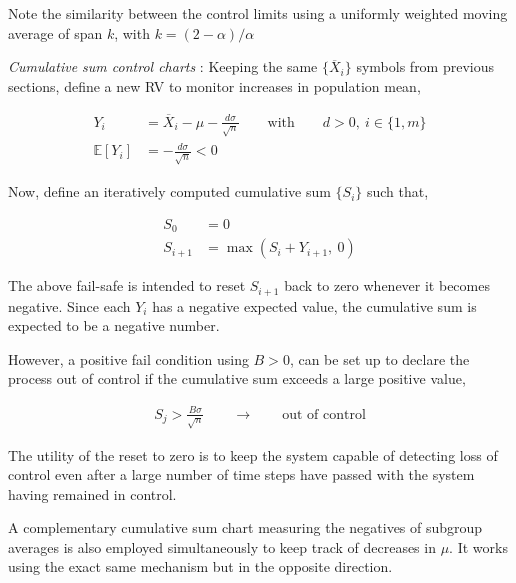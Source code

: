 Note the similarity between the control limits using a uniformly weighted moving average of span $ k $, with $ k = (2-\alpha)/\alpha $

\textit{Cumulative sum control charts} : Keeping the same $ \{\overline{X}_i\} $ symbols from previous sections, define a new RV to monitor increases in population mean, 

\begin{align}
	Y_i &= \overline{X}_i - \mu - \frac{d\sigma}{\sqrt{n}} \qquad \text{with} \qquad d > 0,\ i \in \{1, m\} \\
	\mathbb{E}[Y_i] &= - \frac{d\sigma}{\sqrt{n}} < 0
\end{align}

Now, define an iteratively computed cumulative sum $ \{S_i\} $ such that,

\begin{align}
	S_0 &= 0 \\
	S_{i+1} &= \max(S_i + Y_{i+1},\ 0)
\end{align}

The above fail-safe is intended to reset $ S_{i+1} $ back to zero whenever it becomes negative. Since each $ Y_i $ has a negative expected value, the cumulative sum is expected to be a negative number. 

However, a positive fail condition using $ B > 0 $, can be set up to declare the process out of control if the cumulative sum exceeds a large positive value,

\begin{align}
	S_j > \frac{B\sigma}{\sqrt{n}} \qquad \to \qquad \text{out of control}
\end{align}

The utility of the reset to zero is to keep the system capable of detecting loss of control even after a large number of time steps have passed with the system having remained in control.

A complementary cumulative sum chart measuring the negatives of subgroup averages is also employed simultaneously to keep track of decreases in $ \mu $. It works using the exact same mechanism but in the opposite direction.








